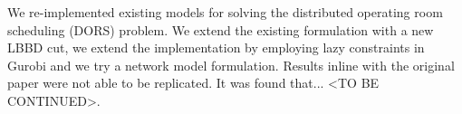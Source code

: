 We re-implemented existing models\cite{roshanaei2017propagating} for solving the distributed operating room scheduling (DORS) problem. We extend the existing formulation with a new LBBD cut, we extend the implementation by employing lazy constraints in Gurobi and we try a network model formulation. Results inline with the original paper were not able to be replicated. It was found that... <TO BE CONTINUED>. %